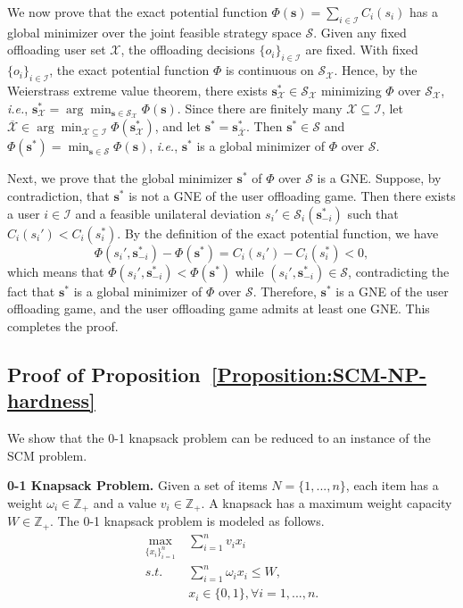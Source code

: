 \documentclass[lettersize,journal]{IEEEtran}
\newcommand{\ie}{\emph{i.e.}}
\begin{document}
We now prove that the exact potential function $\Phi(\boldsymbol{s})=\sum_{i\in\mathcal{I}}C_i(s_i)$ has a global minimizer over the joint feasible strategy space $\mathcal{S}$.
Given any fixed offloading user set $\mathcal{X}$, the offloading decisions $\{o_i\}_{i\in\mathcal{I}}$ are fixed. With fixed $\{o_i\}_{i\in\mathcal{I}}$, the exact potential function $\Phi$ is continuous on $\mathcal{S}_{\mathcal{X}}$. Hence, by the Weierstrass extreme value theorem, there exists $\boldsymbol{s}_{\mathcal{X}}^*\in\mathcal{S}_{\mathcal{X}}$ minimizing $\Phi$ over $\mathcal{S}_{\mathcal{X}}$, \ie, $\boldsymbol{s}^*_{\mathcal{X}}=\arg\min_{\boldsymbol{s}\in\mathcal{S}_{\mathcal{X}}}\Phi(\boldsymbol{s})$. Since there are finitely many $\mathcal{X}\subseteq\mathcal{I}$, let $\overline{\mathcal{X}}\in\arg\min_{\mathcal{X}\subseteq\mathcal{I}}\Phi(\boldsymbol{s}^*_{\mathcal{X}})$, and let $\boldsymbol{s}^*=\boldsymbol{s}^*_{\overline{\mathcal{X}}}$. Then $\boldsymbol{s}^*\in\mathcal{S}$ and $\Phi(\boldsymbol{s}^*)=\min_{\boldsymbol{s}\in\mathcal{S}}\Phi(\boldsymbol{s})$, \ie, $\boldsymbol{s}^*$ is a global minimizer of $\Phi$ over $\mathcal{S}$.

Next, we prove that the global minimizer $\boldsymbol{s}^*$ of $\Phi$ over $\mathcal{S}$ is a GNE. Suppose, by contradiction, that $\boldsymbol{s}^*$ is not a GNE of the user offloading game. Then there exists a user $i\in\mathcal{I}$ and a feasible unilateral deviation $s_i'\in\mathcal{S}_i(\boldsymbol{s}^*_{-i})$ such that $C_i(s_i')<C_i(s_i^*)$. By the definition of the exact potential function, we have 
\begin{equation}
    \Phi(s_i',\boldsymbol{s}^*_{-i})-\Phi(\boldsymbol{s}^*)=C_i(s_i')-C_i(s_i^*)<0,
\end{equation}
which means that $\Phi(s_i',\boldsymbol{s}^*_{-i})<\Phi(\boldsymbol{s}^*)$ while $(s_i',\boldsymbol{s}^*_{-i})\in\mathcal{S}$, contradicting the fact that $\boldsymbol{s}^*$ is a global minimizer of $\Phi$ over $\mathcal{S}$. Therefore, $\boldsymbol{s}^*$ is a GNE of the user offloading game, and the user offloading game admits at least one GNE. This completes the proof.

\subsection{Proof of Proposition~\ref{Proposition:SCM-NP-hardness}}\label{proof:prop-SCM-NP-hard}
We show that the 0-1 knapsack problem can be reduced to an instance of the SCM problem.

    \textbf{0-1 Knapsack Problem.} Given a set of items $N=\{1,...,n\}$, each item has a weight $\omega_i\in\mathbb{Z}_+$ and a value $v_i\in\mathbb{Z}_+$. A knapsack has a maximum weight capacity $W\in\mathbb{Z}_+$. The 0-1 knapsack problem is modeled as follows.
    \begin{align*}
        \max_{\{x_i\}_{i=1}^n}\ &\sum_{i=1}^n v_ix_i\\
        s.t.\ &\sum_{i=1}^n \omega_ix_i\le W,\\ 
        &x_i\in\{0,1\},\forall i=1,...,n.
    \end{align*}
\end{document}
